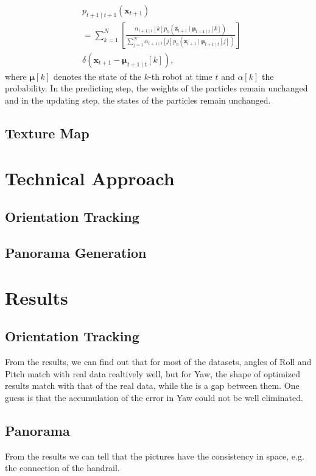 \documentclass[conference]{IEEEtran}
\begin{document}
\begin{equation}
    \begin{aligned}
    &p_{t+1 \mid t+1}\left(\boldsymbol{x}_{t+1}\right) 
    \\&=\sum_{k=1}^N\left[\frac{\alpha_{t+1 \mid t}[k] p_h\left(\boldsymbol{z}_{t+1} \mid \boldsymbol{\mu}_{t+1 \mid t}[k]\right)}{\sum_{j=1}^N \alpha_{t+1 \mid t}[j] p_h\left(\boldsymbol{z}_{t+1} \mid \boldsymbol{\mu}_{t+1 \mid t}[j]\right)}\right] 
    \\ &\delta\left(\boldsymbol{x}_{t+1}-\boldsymbol{\mu}_{t+1 \mid t}[k]\right),
    \end{aligned}
\end{equation}
where $\boldsymbol{\mu}[k]$ denotes the state of the $k$-th robot at time $t$ and $\alpha[k]$ the probability. In the predicting step, the
weights of the particles remain unchanged and in the updating step, the states of the particles remain unchanged.

\subsection{Texture Map}


\section{Technical Approach}
\subsection{Orientation Tracking}


\subsection{Panorama Generation}

\section{Results}
\subsection{Orientation Tracking}
From the results, we can find out that for most of the datasets, angles of Roll and Pitch match with real data realtively
well, but for Yaw, the shape of optimized results match with that of the real data, while the is a gap between them. One
guess is that the accumulation of the error in Yaw could not be well eliminated.

\subsection{Panorama}
From the results we can tell that the pictures have the consistency in space, e.g. the connection of the handrail.
\end{document}
